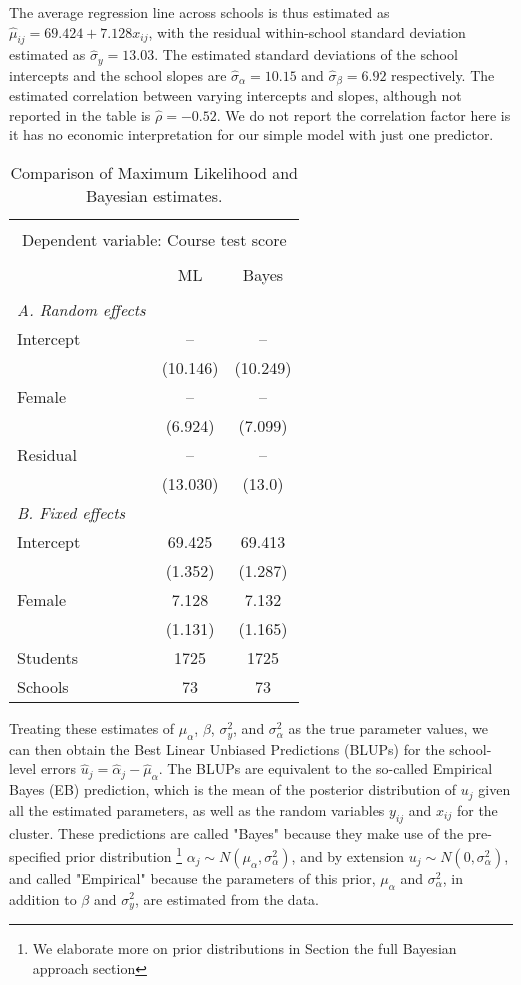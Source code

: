 The average regression line across schools is thus estimated as $\hat{\mu}_{ij} = 69.424 + 7.128 x_{ij}$, with the residual within-school standard deviation estimated as $\hat{\sigma}_{y}=13.03$. The estimated standard deviations of the school intercepts and the school slopes are $\hat{\sigma}_{\alpha}= 10.15$ and $\hat{\sigma}_{\beta}=6.92$ respectively. The estimated correlation between varying intercepts and slopes, although not reported in the table is $\hat{\rho} = -0.52$. We do not report the correlation factor here is it has no economic interpretation for our simple model with just one predictor.

\begin{table}[H]
	\centering
	\caption{{\small Comparison of Maximum Likelihood and Bayesian estimates.}}
	\label{}

	\smallskip
	\begin{tabular}{l*{2}{c}}
		\toprule \\[-1.0em]
		\multicolumn{3}{c}{Dependent variable: Course test score}\\ \\[-1.0em]
		&ML &Bayes\\
		\midrule \\[-1.0em]
		\emph{A. Random effects}\\
		Intercept & -- & --\\
		& (10.146) & (10.249)\\
		Female & -- & --\\
		& (6.924) & (7.099)\\
		Residual & -- & --\\
		& (13.030) & (13.0)\\
		\emph{B. Fixed effects} \\
		Intercept & 69.425 & 69.413\\
		& (1.352) & (1.287)\\
		Female & 7.128 & 7.132\\
		& (1.131) & (1.165)\\
		\hline
		Students&1725&1725\\
		Schools&73&73\\
		\bottomrule

	\end{tabular}
\label{tab:results}
\end{table}
Treating these estimates of $\mu_\alpha$, $\beta$, $\sigma^2_{y}$, and $\sigma^2_{\alpha}$ as the true parameter values, we can then obtain the Best Linear Unbiased Predictions (BLUPs) for the school-level errors $\hat{u}_j = \hat{\alpha}_{j} - \hat{\mu}_{\alpha}$. The BLUPs are equivalent to the so-called Empirical Bayes (EB) prediction, which is the mean of the posterior distribution of $u_{j}$ given all the estimated parameters, as well as the random variables $y_{ij}$ and $x_{ij}$ for the cluster.  These predictions are called "Bayes" because they make use of the pre-specified prior distribution \footnote{We elaborate more on prior distributions in Section the full Bayesian approach section} $\alpha_j \sim N(\mu_\alpha, \sigma^2_\alpha)$, and by extension $u_j \sim N(0, \sigma^2_\alpha)$, and called "Empirical" because the parameters of this prior, $\mu_\alpha$ and $\sigma^2_{\alpha}$, in addition to $\beta$ and $\sigma^2_{y}$, are estimated from the data.

